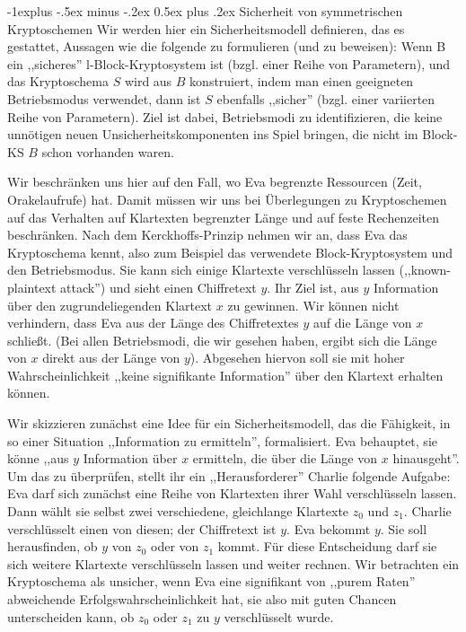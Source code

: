 \documentclass[a4paper]{article}
\makeatletter
\renewcommand{\subsection}{\@startsection{subsection}{2}{0mm}%
 {-1explus -.5ex minus -.2ex}%
 {0.5ex plus .2ex}%
 {\normalfont\normalsize\bfseries}}
\makeatother
\begin{document}
\begin{multicols}{3}
    \subsection{Sicherheit von symmetrischen Kryptoschemen}
    Wir werden hier ein Sicherheitsmodell definieren, das es gestattet, Aussagen wie die folgende zu formulieren (und zu beweisen): Wenn B ein ,,sicheres'' l-Block-Kryptosystem ist (bzgl. einer Reihe von Parametern), und das Kryptoschema $S$ wird aus $B$ konstruiert, indem man einen geeigneten Betriebsmodus verwendet, dann ist $S$ ebenfalls ,,sicher'' (bzgl. einer variierten Reihe von Parametern). Ziel ist dabei, Betriebsmodi zu identifizieren, die keine unnötigen neuen Unsicherheitskomponenten ins Spiel bringen, die nicht im Block-KS
    $B$ schon vorhanden waren.

    Wir beschränken uns hier auf den Fall, wo Eva begrenzte Ressourcen (Zeit, Orakelaufrufe) hat. Damit müssen wir uns bei Überlegungen zu Kryptoschemen auf das Verhalten auf Klartexten begrenzter Länge und auf feste Rechenzeiten beschränken. Nach dem Kerckhoffs-Prinzip nehmen wir an, dass Eva das Kryptoschema kennt, also zum Beispiel das verwendete Block-Kryptosystem und den Betriebsmodus. Sie kann sich einige Klartexte verschlüsseln lassen (,,known-plaintext attack'') und sieht einen Chiffretext $y$. Ihr Ziel ist, aus $y$ Information über den zugrundeliegenden Klartext $x$ zu gewinnen. Wir können nicht verhindern, dass Eva aus der Länge des Chiffretextes $y$ auf die Länge von $x$ schließt. (Bei allen Betriebsmodi, die wir gesehen haben, ergibt sich die Länge von $x$ direkt aus der Länge von $y$). Abgesehen hiervon soll sie mit hoher Wahrscheinlichkeit ,,keine signifikante Information'' über den Klartext erhalten können.

    Wir skizzieren zunächst eine Idee für ein Sicherheitsmodell, das die Fähigkeit, in so einer Situation ,,Information zu ermitteln'', formalisiert. Eva behauptet, sie könne ,,aus $y$ Information über $x$ ermitteln, die über die Länge von $x$ hinausgeht''. Um das zu überprüfen, stellt ihr ein ,,Herausforderer'' Charlie folgende Aufgabe: Eva darf sich zunächst eine Reihe von Klartexten ihrer Wahl verschlüsseln lassen. Dann wählt sie selbst zwei verschiedene, gleichlange Klartexte $z_0$ und $z_1$. Charlie verschlüsselt einen von diesen; der Chiffretext ist $y$. Eva bekommt $y$. Sie soll herausfinden, ob $y$ von $z_0$ oder von $z_1$ kommt. Für diese Entscheidung darf sie sich weitere Klartexte verschlüsseln lassen und weiter rechnen. Wir betrachten ein Kryptoschema als unsicher, wenn Eva eine signifikant von ,,purem Raten'' abweichende Erfolgswahrscheinlichkeit hat, sie also mit guten Chancen unterscheiden kann, ob $z_0$ oder $z_1$ zu $y$ verschlüsselt wurde.


\end{multicols}
\end{document}
